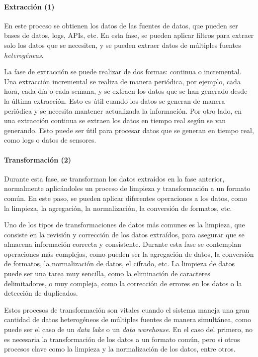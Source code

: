 \paragraph{Extracción (1)}
En este proceso se obtienen los datos de las fuentes de datos, que pueden ser
bases de datos, logs, APIs, etc. En esta fase, se pueden aplicar filtros para
extraer solo los datos que se necesiten, y se pueden extraer datos de múltiples
fuentes \emph{heterogéneas}.

La fase de extracción se puede realizar de dos formas: continua o incremental.
Una extracción incremental se realiza de manera periódica, por ejemplo, cada
hora, cada día o cada semana, y se extraen los datos que se han generado desde
la última extracción. Esto es útil cuando los datos se generan de manera
periódica y se necesita mantener actualizada la información. Por otro lado, en
una extracción continua se extraen los datos en tiempo real según se van
generando. Esto puede ser útil para procesar datos que se generan en tiempo
real, como logs o datos de sensores.

\newpage{}
\paragraph{Transformación (2)}
Durante esta fase, se transforman los datos extraídos en la fase anterior,
normalmente aplicándoles un proceso de limpieza y transformación a un
formato común. En este paso, se pueden aplicar diferentes operaciones a los
datos, como la limpieza, la agregación, la normalización, la conversión de
formatos, etc.

Uno de los tipos de transformaciones de datos más comunes es la limpieza, que
consiste en la revisión y corrección de los datos extraídos, para asegurar que
se almacena información correcta y consistente. Durante esta fase se contemplan
operaciones más complejas, como pueden ser la agregación de datos, la conversión
de formatos, la normalización de datos, el cifrado, etc. La limpieza de datos
puede ser una tarea muy sencilla, como la eliminación de caracteres
delimitadores, o muy compleja, como la corrección de errores en los datos o la
detección de duplicados.

Estos procesos de transformación son vitales cuando el sistema maneja una gran
cantidad de datos heterogéneos de múltiples fuentes de manera simultánea, como
puede ser el caso de un \textit{data lake} o un \textit{data
warehouse}. En el caso del primero, no es necesaria la transformación de los
datos a un formato común, pero si otros procesos clave como la limpieza y la
normalización de los datos, entre otros.

